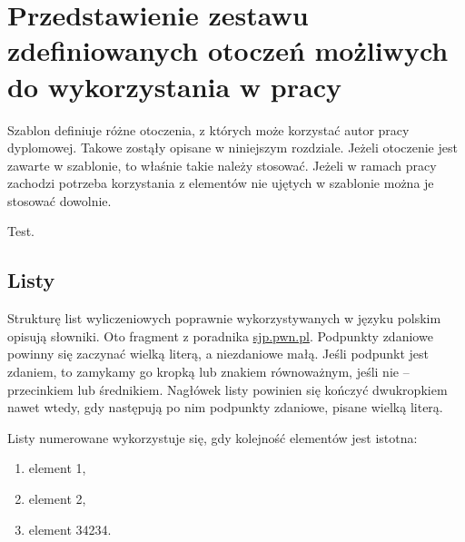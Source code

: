 %



\chapter{Przedstawienie zestawu zdefiniowanych otoczeń możliwych do wykorzystania w pracy}

Szablon definiuje różne otoczenia, z których może korzystać autor pracy dyplomowej.
Takowe zostąły opisane w niniejszym rozdziale.
Jeżeli otoczenie jest zawarte w szablonie, to właśnie takie należy stosować.
Jeżeli w ramach pracy zachodzi potrzeba korzystania z elementów nie ujętych w szablonie można je stosować dowolnie.

\noindent Test.


\section{Listy}

Strukturę list wyliczeniowych poprawnie wykorzystywanych w języku polskim opisują słowniki. Oto fragment z poradnika \url{sjp.pwn.pl}. Podpunkty zdaniowe powinny się zaczynać wielką literą, a niezdaniowe małą. Jeśli podpunkt jest zdaniem, to zamykamy go kropką lub znakiem równoważnym, jeśli nie – przecinkiem lub średnikiem. Nagłówek listy powinien się kończyć dwukropkiem nawet wtedy, gdy następują po nim podpunkty zdaniowe, pisane wielką literą.

\noindent Listy numerowane wykorzystuje się, gdy kolejność elementów jest istotna:
\begin{enumerate}
    \item element 1,
    \item element 2,
    \item element 34234.
\end{enumerate}


